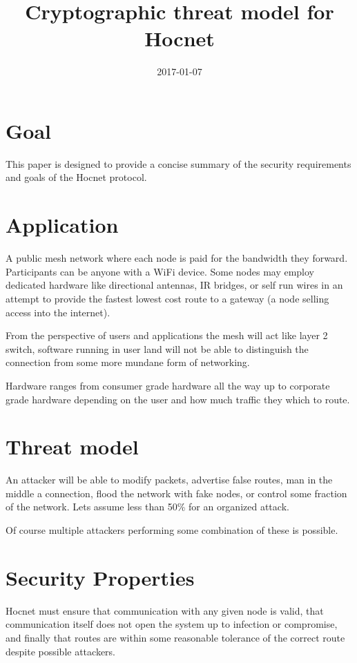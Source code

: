 \documentclass[11pt]{article}
\title{\textbf{Cryptographic threat model for Hocnet}}
\date{2017-01-07}
\begin{document}
\maketitle

\section{Goal}

This paper is designed to provide a concise summary of the security requirements and goals of the Hocnet protocol.

\section{Application}

A public mesh network where each node is paid for the bandwidth they forward. Participants can be anyone with a WiFi device. Some nodes may employ dedicated hardware like directional antennas, IR bridges, or self run wires in an attempt to provide the fastest lowest cost route to a gateway (a node selling access into the internet). 

From the perspective of users and applications the mesh will act like layer 2 switch, software running in user land will not be able to distinguish the connection from some more mundane form of networking. 

Hardware ranges from consumer grade hardware all the way up to corporate grade hardware depending on the user and how much traffic they which to route. 

\section{Threat model}

An attacker will be able to modify packets, advertise false routes, man in the middle a connection, flood the network with fake nodes, or control some fraction of the network. Lets assume less than 50\% for an organized attack.

Of course multiple attackers performing some combination of these is possible.  

\section{Security Properties}

Hocnet must ensure that communication with any given node is valid, that communication itself does not open the system up to infection or compromise, and finally that routes are within some reasonable tolerance of the correct route despite possible attackers. 
\end{document}
